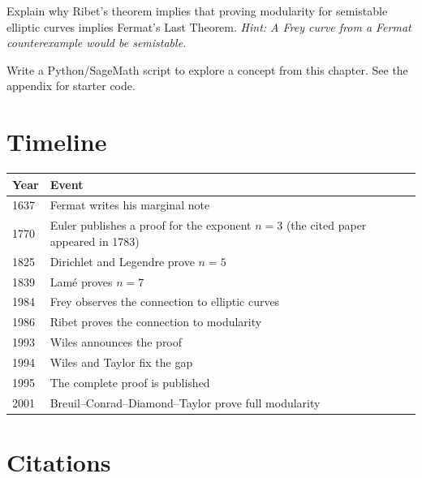 \begin{exercise}[Challenge]
Explain why Ribet's theorem implies that proving modularity for semistable elliptic curves implies Fermat's Last Theorem. \emph{Hint: A Frey curve from a Fermat counterexample would be semistable.}
\end{exercise}


\begin{exercise}[Computational]
Write a Python/SageMath script to explore a concept from this chapter. See the appendix for starter code.
\end{exercise}

\section{Timeline}

\begin{tabularx}{\linewidth}{lX}
\toprule
\textbf{Year} & \textbf{Event} \\ \midrule
1637 & Fermat writes his marginal note \\ 
1770 & Euler publishes a proof for the exponent $n=3$ (the cited paper appeared in 1783) \cite{euler1783} \\
1825 & Dirichlet and Legendre prove $n = 5$ \\ 
1839 & Lam\'e proves $n = 7$ \\ 
1984 & Frey observes the connection to elliptic curves \cite{frey1984} \\ 
1986 & Ribet proves the connection to modularity \cite{ribet1990} \\ 
1993 & Wiles announces the proof \cite{wiles1995} \\ 
1994 & Wiles and Taylor fix the gap \cite{taylorwiles1995} \\ 
1995 & The complete proof is published \cite{wiles1995,taylorwiles1995} \\ 
2001 & Breuil--Conrad--Diamond--Taylor prove full modularity \cite{bcdt2001} \\ \bottomrule
\end{tabularx}

\section{Citations}

